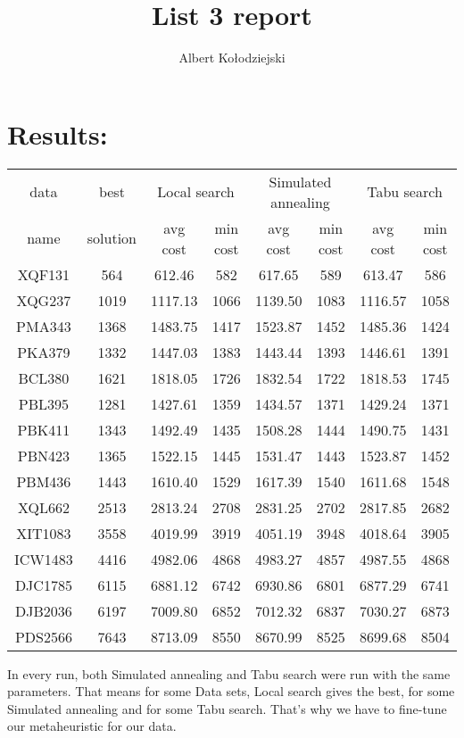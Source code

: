 \documentclass{article}
\title{List 3 report}
\author{Albert Kołodziejski}
\begin{document}
\maketitle
\section*{Results:}
\small
\begin{center}
    \begin{tabular}{| c | c || c | c || c | c || c | c ||}
        \hline
        data & best & \multicolumn{2}{c||}{Local search} & \multicolumn{2}{c||}{Simulated annealing }& \multicolumn{2}{c||}{Tabu search}\\ 
        \cline{3-8}
        name & solution & avg cost & min cost & avg cost & min cost & avg cost & min cost\\
        \hline
        \hline
        XQF131 & 564 & 612.46 & 582 & 617.65 & 589 & 613.47 & 586\\
        \hline
        XQG237 & 1019 & 1117.13 & 1066 & 1139.50 & 1083 & 1116.57 & 1058\\
        \hline
        PMA343 & 1368 & 1483.75 & 1417 & 1523.87 & 1452 & 1485.36 & 1424\\
        \hline
        PKA379 & 1332 & 1447.03 & 1383 & 1443.44 & 1393 & 1446.61 & 1391\\
        \hline
        BCL380 & 1621 & 1818.05 & 1726 & 1832.54 & 1722 & 1818.53 & 1745\\
        \hline
        PBL395 & 1281 & 1427.61 & 1359 & 1434.57 & 1371 & 1429.24 & 1371\\
        \hline
        PBK411 & 1343 & 1492.49 & 1435 & 1508.28 & 1444 & 1490.75 & 1431\\
        \hline
        PBN423 & 1365 & 1522.15 & 1445 & 1531.47 & 1443 & 1523.87 & 1452\\
        \hline
        PBM436 & 1443 & 1610.40 & 1529 & 1617.39 & 1540 & 1611.68 & 1548\\
        \hline
        XQL662 & 2513 & 2813.24 & 2708 & 2831.25 & 2702 & 2817.85 & 2682\\
        \hline
        XIT1083 & 3558 & 4019.99 & 3919 & 4051.19 & 3948 &4018.64 & 3905\\
        \hline
        ICW1483 & 4416 & 4982.06 & 4868 & 4983.27 & 4857 & 4987.55 & 4868\\
        \hline
        DJC1785 & 6115 & 6881.12 & 6742 & 6930.86 & 6801 & 6877.29 & 6741\\
        \hline
        DJB2036 & 6197 & 7009.80 & 6852 & 7012.32 & 6837 & 7030.27 & 6873\\
        \hline
        PDS2566 & 7643 & 8713.09 & 8550 & 8670.99 & 8525 & 8699.68 & 8504\\
        \hline
    \end{tabular}
    \end{center}
\normalsize
In every run, both Simulated annealing and Tabu search were run with the same parameters. That means for some Data sets, Local search gives the best, for some Simulated annealing and for some Tabu search. That's why we have to fine-tune our metaheuristic for our data.\\
\end{document}
